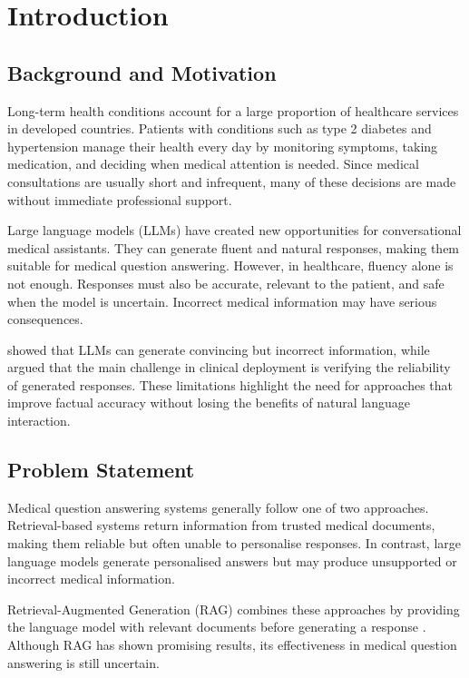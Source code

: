 \section{Introduction}
\label{sec:Introduction}

\subsection{Background and Motivation}

Long-term health conditions account for a large proportion of healthcare services in developed countries. Patients with conditions such as type 2 diabetes and hypertension manage their health every day by monitoring symptoms, taking medication, and deciding when medical attention is needed. Since medical consultations are usually short and infrequent, many of these decisions are made without immediate professional support.

Large language models (LLMs) have created new opportunities for conversational medical assistants. They can generate fluent and natural responses, making them suitable for medical question answering. However, in healthcare, fluency alone is not enough. Responses must also be accurate, relevant to the patient, and safe when the model is uncertain. Incorrect medical information may have serious consequences.

\citet{ji2023} showed that LLMs can generate convincing but incorrect information, while \citet{thirunavukarasu2023} argued that the main challenge in clinical deployment is verifying the reliability of generated responses. These limitations highlight the need for approaches that improve factual accuracy without losing the benefits of natural language interaction.

\subsection{Problem Statement}

Medical question answering systems generally follow one of two approaches. Retrieval-based systems return information from trusted medical documents, making them reliable but often unable to personalise responses. In contrast, large language models generate personalised answers but may produce unsupported or incorrect medical information.

Retrieval-Augmented Generation (RAG) combines these approaches by providing the language model with relevant documents before generating a response \citep{lewis2020}. Although RAG has shown promising results, its effectiveness in medical question answering is still uncertain.

